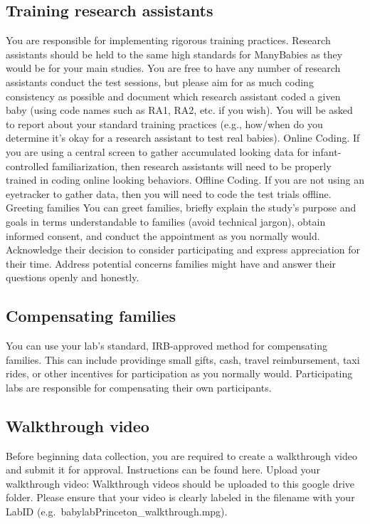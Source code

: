 \documentclass[
]{book}
\begin{document}
\subsection{Training research assistants}\label{training-research-assistants}

You are responsible for implementing rigorous training practices. Research assistants should be held to the same high standards for ManyBabies as they would be for your main studies. You are free to have any number of research assistants conduct the test sessions, but please aim for as much coding consistency as possible and document which research assistant coded a given baby (using code names such as RA1, RA2, etc. if you wish). You will be asked to report about your standard training practices (e.g., how/when do you determine it's okay for a research assistant to test real babies).
Online Coding. If you are using a central screen to gather accumulated looking data for infant-controlled familiarization, then research assistants will need to be properly trained in coding online looking behaviors.
Offline Coding. If you are not using an eyetracker to gather data, then you will need to code the test trials offline.\\
Greeting families
You can greet families, briefly explain the study's purpose and goals in terms understandable to families (avoid technical jargon), obtain informed consent, and conduct the appointment as you normally would. Acknowledge their decision to consider participating and express appreciation for their time. Address potential concerns families might have and answer their questions openly and honestly.

\subsection{Compensating families}\label{compensating-families}

You can use your lab's standard, IRB-approved method for compensating families. This can include providinge small gifts, cash, travel reimbursement, taxi rides, or other incentives for participation as you normally would. Participating labs are responsible for compensating their own participants.

\subsection{Walkthrough video}\label{walkthrough-video}

Before beginning data collection, you are required to create a walkthrough video and submit it for approval. Instructions can be found here.
Upload your walkthrough video:
Walkthrough videos should be uploaded to this google drive folder. Please ensure that your video is clearly labeled in the filename with your LabID (e.g.~babylabPrinceton\_walkthrough.mpg).
\end{document}
